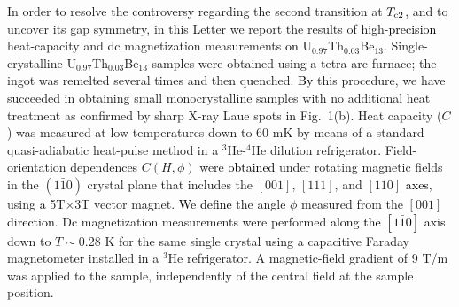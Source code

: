 \documentclass[twocolumn, prl]{revtex4}%
\newcommand{\correct}[1]{\textcolor{black}{#1}}
\begin{document}
\color{black}






In order to  resolve the controversy 
  regarding the second transition  
 at $T_{\rm c2}$,  
and to uncover its gap symmetry, 
  in this Letter we report the results of high-\correct{precision} heat-capacity and dc magnetization measurements \correct{on} 
  U$_{0.97}$Th$_{0.03}$Be$_{13}$.
Single-crystalline U$_{0.97}$Th$_{0.03}$Be$_{13}$   samples were obtained using a  tetra-arc furnace;  
  the ingot was remelted several times and then quenched.
\correct{By} this procedure, we have succeeded in obtaining  small monocrystalline samples  with no additional heat treatment  
 as confirmed by sharp X-ray Laue spots in Fig.~1(b).
\color{black}
 Heat capacity ($C$)    was measured  at low temperatures  down to $60$ mK  by means of a standard quasi-adiabatic heat-pulse method  in a $^3$He-$^4$He dilution refrigerator.
Field-orientation dependences  $C(H, \phi)$
 were \correct{obtained}  under rotating magnetic fields in the $(1\bar{1}0)$ crystal plane  that includes the  $[001]$, $[111]$, and $[110]$ \correct{axes},  using \correct{a} 5T$\times$3T vector magnet.    \correct{We define} the angle $\phi$  measured from the $[001]$ \correct{direction}.
Dc magnetization measurements were performed \correct{along the $[1\bar{1}0]$ axis} down to 
 $T\sim$0.28 K  for the same single crystal  using  a capacitive Faraday magnetometer 
 \cite{Sakakibara_JJAP_1994}  installed \correct{in} a $^{3}$He refrigerator.
A magnetic-field gradient of 9 T/m was  applied to the sample, independently of the central field at the sample position.



\end{document}
